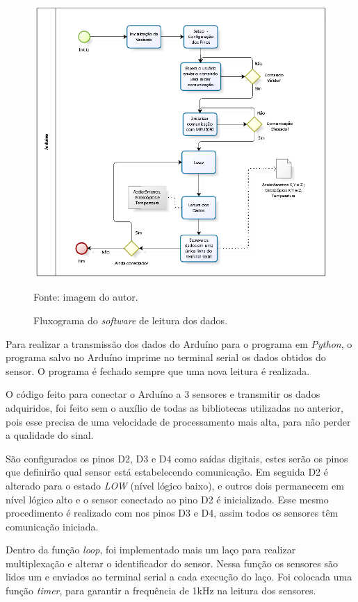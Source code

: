 		\begin{figure}[h]
			\centering
			\includegraphics[keepaspectratio=true,scale=0.9]{figuras/diagrama_embarcado.PNG}
			\caption{Fluxograma do \textit{software} de leitura dos dados. }
			Fonte: imagem do autor. 
			\label{fluxograma_arduino}	
		\end{figure}
		
		Para realizar a transmissão dos dados do Arduíno para o programa em \textit{Python}, o programa salvo no Arduíno imprime no terminal serial os dados obtidos do sensor. O programa é fechado sempre que uma nova leitura é realizada.
		
		O código feito para conectar o Arduíno a 3 sensores e transmitir os dados adquiridos, foi feito sem o auxílio de todas as bibliotecas utilizadas no anterior, pois esse precisa de uma velocidade de processamento mais alta, para não perder a qualidade do sinal. 
		
		São configurados os pinos D2, D3 e D4 como saídas digitais, estes serão os pinos que definirão qual sensor está estabelecendo comunicação. Em seguida D2 é alterado para o estado \textit{LOW } (nível lógico baixo), e outros dois permanecem em nível lógico alto e o sensor conectado ao pino D2 é inicializado. Esse mesmo procedimento é realizado com nos pinos D3 e D4, assim todos os sensores têm comunicação iniciada.
		
		Dentro da função \textit{loop}, foi implementado mais um laço  para realizar multiplexação e alterar o identificador do sensor. Nessa função os sensores são lidos um e enviados ao terminal serial a cada execução do laço. Foi colocada uma função \textit{timer}, para garantir a frequência de 1kHz na leitura dos sensores.

